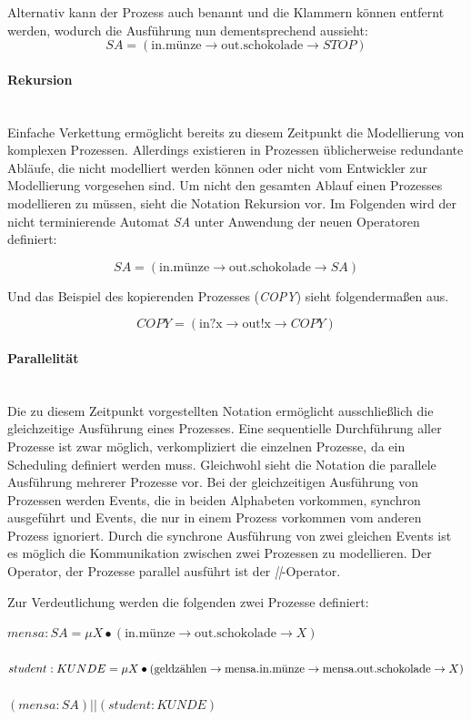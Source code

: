 \documentclass[12pt,a4paper,parskip=half,listof=totoc]{scrreprt}
\begin{document}
Alternativ kann der Prozess auch benannt und die Klammern können entfernt werden, wodurch die Ausführung nun dementsprechend aussieht: 
\[SA = (\text{in.münze} \rightarrow \text{out.schokolade} \rightarrow STOP)\]

\paragraph{Rekursion}
\ \\
Einfache Verkettung ermöglicht bereits zu diesem Zeitpunkt die Modellierung von komplexen Prozessen. Allerdings existieren in Prozessen üblicherweise redundante Abläufe, die nicht modelliert werden können oder nicht vom Entwickler zur Modellierung vorgesehen sind. Um nicht den gesamten Ablauf einen Prozesses modellieren zu müssen, sieht die Notation Rekursion vor. Im Folgenden wird der nicht terminierende Automat \textit{SA} unter Anwendung der neuen Operatoren definiert:

\[SA = (\text{in.münze} \rightarrow \text{out.schokolade} \rightarrow SA)\]

Und das Beispiel des kopierenden Prozesses (\textit{COPY}) sieht folgendermaßen aus.

\[COPY = (\text{in?x} \rightarrow \text{out!x} \rightarrow COPY)\]

\paragraph{Parallelität}
\ \\
Die zu diesem Zeitpunkt vorgestellten Notation ermöglicht ausschließlich die gleichzeitige Ausführung eines Prozesses. Eine sequentielle Durchführung aller Prozesse ist zwar möglich, verkompliziert die einzelnen Prozesse, da ein Scheduling definiert werden muss. Gleichwohl sieht die Notation die parallele Ausführung mehrerer Prozesse vor. Bei der gleichzeitigen Ausführung von Prozessen werden Events, die in beiden Alphabeten vorkommen, synchron ausgeführt und Events, die nur in einem Prozess vorkommen vom anderen Prozess ignoriert. Durch die synchrone Ausführung von zwei gleichen Events ist es möglich die Kommunikation zwischen zwei Prozessen zu modellieren. Der Operator, der Prozesse parallel ausführt ist der \textit{||}-Operator. 

Zur Verdeutlichung werden die folgenden zwei Prozesse definiert:

\begin{addmargin}[1cm]{0cm}
$mensa:SA = \mu X \bullet (\text{in.münze} \rightarrow \text{out.schokolade} \rightarrow X)$\\\\
$student:KUNDE = \mu X \bullet (\text{geldzählen} \rightarrow \text{mensa.in.münze} \rightarrow \\ \text{mensa.out.schokolade} \rightarrow  X)$\\\\
$ (mensa:SA) || (student:KUNDE) $
\end{addmargin}
\end{document}
